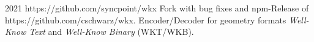 \cventry
{2021}
{https://github.com/syncpoint/wkx}
{}
{}
{}
{
  Fork with bug fixes and npm-Release of https://github.com/cschwarz/wkx.
  Encoder/Decoder for geometry formats \emph{Well-Know Text} and \emph{Well-Know Binary} (WKT/WKB).
}
